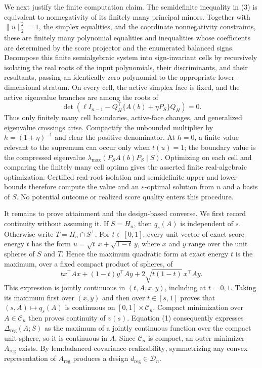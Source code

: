 We next justify the finite computation claim.  The semidefinite inequality in (3) is equivalent to nonnegativity of its finitely many principal minors.  Together with \(\|u\|_2^2=1\), the simplex equalities, and the coordinate nonnegativity constraints, these are finitely many polynomial equalities and inequalities whose coefficients are determined by the score projector and the enumerated balanced signs.  Decompose this finite semialgebraic system into sign-invariant cells by recursively isolating the real roots of the input polynomials, their discriminants, and their resultants, passing an identically zero polynomial to the appropriate lower-dimensional stratum.  On every cell, the active simplex face is fixed, and the active eigenvalue branches are among the roots of
\[
 \det\!\left(\ell I_{n-1}-Q_H^\top\{A(b)+\eta P_S\}Q_H\right)=0.
\]
Thus only finitely many cell boundaries, active-face changes, and generalized eigenvalue crossings arise.  Compactify the unbounded multiplier by \(h=(1+\eta)^{-1}\) and clear the positive denominator.  At \(h=0\), a finite value relevant to the supremum can occur only when \(t(u)=1\); the boundary value is the compressed eigenvalue \(\lambda_{\max}(P_SA(b)P_S\mid S)\).  Optimizing on each cell and comparing the finitely many cell optima gives the asserted finite real-algebraic optimization.  Certified real-root isolation and semidefinite upper and lower bounds therefore compute the value and an \(\varepsilon\)-optimal solution from \(n\) and a basis of \(S\).  No potential outcome or realized score quality enters this procedure.

It remains to prove attainment and the design-based converse.  We first record continuity without assuming it.  If \(S=H_n\), then \(q_s(A)\) is independent of \(s\).  Otherwise write \(T=H_n\cap S^\perp\).  For \(t\in[0,1]\), every unit vector of exact score energy \(t\) has the form
\(u=\sqrt t\,x+\sqrt{1-t}\,y\), where \(x\) and \(y\) range over the unit spheres of \(S\) and \(T\).  Hence the maximum quadratic form at exact energy \(t\) is the maximum, over a fixed compact product of spheres, of
\[
 t x^\top Ax+(1-t)y^\top Ay
 +2\sqrt{t(1-t)}\,x^\top Ay.
\]
This expression is jointly continuous in \((t,A,x,y)\), including at \(t=0,1\).  Taking its maximum first over \((x,y)\) and then over \(t\in[s,1]\) proves that \((s,A)\mapsto q_s(A)\) is continuous on \([0,1]\times\mathcal C_n\).  Compact minimization over \(A\in\mathcal C_n\) then proves continuity of \(v(s)\).  Equation (1) consequently expresses \(\Delta_{\mathrm{reg}}(A;S)\) as the maximum of a jointly continuous function over the compact unit sphere, so it is continuous in \(A\).  Since \(\mathcal C_n\) is compact, an outer minimizer \(A_{\mathrm{reg}}\) exists.  By \(\text{lem:balanced-covariance-realizability}\), symmetrizing any convex representation of \(A_{\mathrm{reg}}\) produces a design \(d_{\mathrm{reg}}\in\mathcal D_n\).

